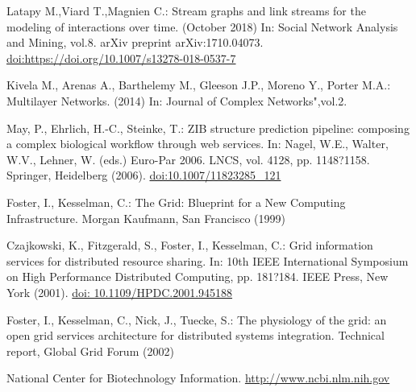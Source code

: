 \documentclass{svproc}
\begin{document}
%
\begin{thebibliography}{6}
%


Latapy M.,Viard T.,Magnien C.: Stream graphs and link streams for the modeling
of interactions over time. (October 2018) In: Social Network Analysis and Mining, vol.8. arXiv preprint arXiv:1710.04073. \url{doi:https://doi.org/10.1007/s13278-018-0537-7}

Kivela M., Arenas A., Barthelemy M., Gleeson J.P., Moreno Y., Porter M.A.: Multilayer Networks. (2014) In: Journal of Complex Networks",vol.2.


May, P., Ehrlich, H.-C., Steinke, T.: ZIB structure prediction pipeline:
composing a complex biological workflow through web services.
In: Nagel, W.E., Walter, W.V., Lehner, W. (eds.) Euro-Par 2006.
LNCS, vol. 4128, pp. 1148?1158. Springer, Heidelberg (2006).
\url{doi:10.1007/11823285_121}


Foster, I., Kesselman, C.: The Grid: Blueprint for a New Computing Infrastructure.
Morgan Kaufmann, San Francisco (1999)

Czajkowski, K., Fitzgerald, S., Foster, I., Kesselman, C.: Grid information services
for distributed resource sharing. In: 10th IEEE International Symposium
on High Performance Distributed Computing, pp. 181?184. IEEE Press, New York (2001).
\url{doi: 10.1109/HPDC.2001.945188}

Foster, I., Kesselman, C., Nick, J., Tuecke, S.: The physiology of the grid: an open grid services architecture for distributed systems integration. Technical report, Global Grid
Forum (2002)

National Center for Biotechnology Information. \url{http://www.ncbi.nlm.nih.gov}


\end{thebibliography}
\end{document}
